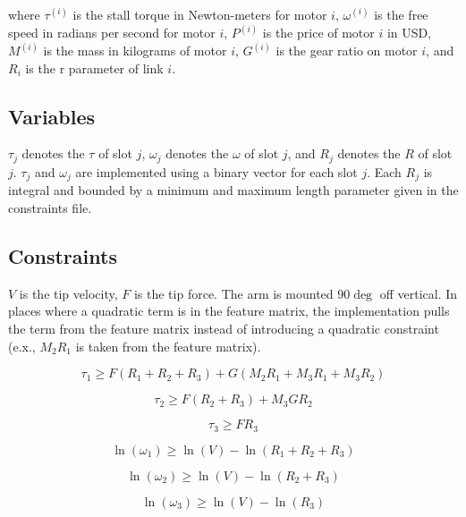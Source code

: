 \documentclass{article}
\begin{document}
where $\tau^{(i)}$ is the stall torque in Newton-meters for motor $i$,
$\omega^{(i)}$ is the free speed in radians per second for motor $i$, $P^{(i)}$
is the price of motor $i$ in USD, $M^{(i)}$ is the mass in kilograms of motor
$i$, $G^{(i)}$ is the gear ratio on motor $i$, and $R_i$ is the r parameter of
link $i$.

\FloatBarrier{}
\subsection{Variables}

$\tau_j$ denotes the $\tau$ of slot $j$, $\omega_j$ denotes the $\omega$ of
slot $j$, and $R_j$ denotes the $R$ of slot $j$. $\tau_j$ and $\omega_j$ are
implemented using a binary vector for each slot $j$. Each $R_j$ is integral and
bounded by a minimum and maximum length parameter given in the constraints
file.

\FloatBarrier{}
\subsection{Constraints}

$V$ is the tip velocity, $F$ is the tip force. The arm is mounted $90 \deg$ off
vertical. In places where a quadratic term is in the feature matrix, the
implementation pulls the term from the feature matrix instead of introducing a
quadratic constraint (e.x., $M_2 R_1$ is taken from the feature matrix).

\begin{equation}
    \tau_{1} \geq F(R_1 + R_2 + R_3) + G (M_2 R_1 + M_3 R_1 + M_3 R_2)
\end{equation}

\begin{equation}
    \tau_{2} \geq F(R_2 + R_3) + M_3 G R_2
\end{equation}

\begin{equation}
    \tau_{3} \geq F R_3
\end{equation}

\begin{equation}
    \ln(\omega_{1}) \geq \ln(V) - \ln(R_1 + R_2 + R_3)
\end{equation}

\begin{equation}
    \ln(\omega_{2}) \geq \ln(V) - \ln(R_2 + R_3)
\end{equation}

\begin{equation}
    \ln(\omega_{3}) \geq \ln(V) - \ln(R_3)
\end{equation}
\end{document}
